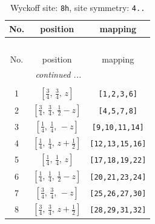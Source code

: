 \documentclass[fleqn,8pt]{jsarticle}
\begin{document}
\begin{longtable}{ccc}
\caption{Wyckoff site: {\tt 8h}, site symmetry: {\tt 4..}}
 \\
 \hline \hline
No. & position & mapping \\ \hline \endfirsthead

\multicolumn{2}{l}{\tablename\ \thetable{}} \\
 \hline \hline
No. & position & mapping \\ \hline \endhead

 \hline \hline
\multicolumn{2}{r}{\footnotesize\it continued ...} \\ \endfoot

 \hline \hline
\multicolumn{2}{r}{} \\ \endlastfoot

1 & $\left[ \frac{3}{4},\, \frac{3}{4},\, z \right]$ & {\tt [1,2,3,6]} \\ \hline
2 & $\left[ \frac{3}{4},\, \frac{3}{4},\, \frac{1}{2} - z \right]$ & {\tt [4,5,7,8]} \\ \hline
3 & $\left[ \frac{1}{4},\, \frac{1}{4},\, - z \right]$ & {\tt [9,10,11,14]} \\ \hline
4 & $\left[ \frac{1}{4},\, \frac{1}{4},\, z + \frac{1}{2} \right]$ & {\tt [12,13,15,16]} \\ \hline
5 & $\left[ \frac{1}{4},\, \frac{1}{4},\, z \right]$ & {\tt [17,18,19,22]} \\ \hline
6 & $\left[ \frac{1}{4},\, \frac{1}{4},\, \frac{1}{2} - z \right]$ & {\tt [20,21,23,24]} \\ \hline
7 & $\left[ \frac{3}{4},\, \frac{3}{4},\, - z \right]$ & {\tt [25,26,27,30]} \\ \hline
8 & $\left[ \frac{3}{4},\, \frac{3}{4},\, z + \frac{1}{2} \right]$ & {\tt [28,29,31,32]} \\
\end{longtable}
\renewcommand{\arraystretch}{1.2}
\end{document}
